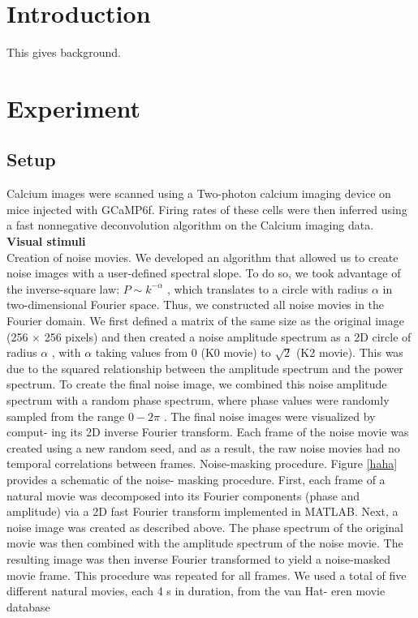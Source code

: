 \documentclass[11pt]{article}
\newcommand*{\titleGM}{\begingroup %
\hbox{ %
\hspace*{0.2\textwidth} %
\rule{1pt}{\textheight} %
\hspace*{0.05\textwidth} %
\parbox[b]{0.75\textwidth}{ %

{\noindent\Huge\bfseries  Neural data analysis}\\[2\baselineskip] %
{\large \textit{Notes}}\\[4\baselineskip] %
{\Large \textsc{Athul Vijayan \hspace{5pt} ed11b004}} %

\vspace{0.5\textheight} %
}}
\endgroup}
\begin{document}
\tableofcontents

\newpage
\section{Introduction} %
\label{sec:introduction}
This gives background.

\section{Experiment} %
\label{sec:experiment}
\subsection{Setup} %
\label{sub:setup}
Calcium images were scanned using a Two-photon calcium imaging device on mice injected with GCaMP6f. Firing rates of these cells were then inferred using a fast nonnegative deconvolution algorithm on the Calcium imaging data.\\


\textbf{Visual stimuli}\\
Creation of noise movies. We developed an algorithm that allowed us to
create noise images with a user-defined spectral slope. To do so, we took
advantage of the inverse-square law: $P \sim k^{-\alpha}$ , which translates to a circle
with radius $\alpha$ in two-dimensional Fourier space. Thus, we constructed all
noise movies in the Fourier domain. We first defined a matrix of the same
size as the original image (256 $\times$ 256 pixels) and then created a noise
amplitude spectrum as a 2D circle of radius $\alpha$ , with $\alpha$ taking values from
0 (K0 movie) to $\sqrt{2}$ (K2 movie). This was due to the squared relationship
between the amplitude spectrum and the power spectrum. To create the
final noise image, we combined this noise amplitude spectrum with a
random phase spectrum, where phase values were randomly sampled
from the range $0 - 2\pi$ . The final noise images were visualized by comput-
ing its 2D inverse Fourier transform. Each frame of the noise movie was
created using a new random seed, and as a result, the raw noise movies
had no temporal correlations between frames.
Noise-masking procedure. Figure \ref{haha} provides a schematic of the noise-
masking procedure. First, each frame of a natural movie was decomposed into its Fourier components (phase and amplitude) via a 2D fast Fourier
transform implemented in MATLAB. Next, a noise image was created as
described above. The phase spectrum of the original movie was then
combined with the amplitude spectrum of the noise movie. The resulting
image was then inverse Fourier transformed to yield a noise-masked
movie frame. This procedure was repeated for all frames. We used a total
of five different natural movies, each 4 s in duration, from the van Hat-
eren movie database
\end{document}
